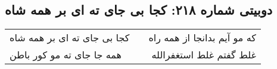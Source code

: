 \begin{center}
\section*{دوبیتی شماره ۲۱۸: کجا بی جای ته ای بر همه شاه}
\label{sec:218}
\begin{longtable}{l p{0.5cm} r}
کجا بی جای ته ای بر همه شاه
&&
که مو آیم بدانجا از همه راه
\\
همه جا جای ته مو کور باطن
&&
غلط گفتم غلط استغفرالله
\\
\end{longtable}
\end{center}
